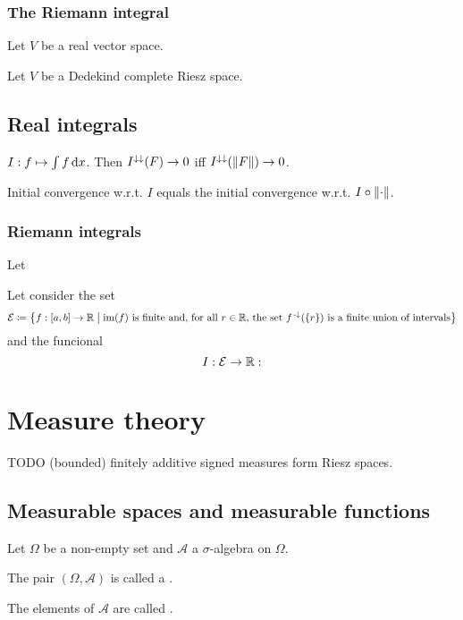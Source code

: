 \subsection{The Riemann integral}
\begin{definition}
Let $V$ be a real vector space. 
\end{definition}



\begin{definition}
Let $V$ be a Dedekind complete Riesz space. 
\end{definition}


\section{Real integrals}

\begin{proposition}
$I: f\mapsto \int f \operatorname{d \!}{x}$. Then $I^{\downarrow\downarrow}(F) \to 0$ iff $I^{\downarrow\downarrow}(\lVert F\rVert) \to 0$.
\end{proposition}
\begin{corollary}
Initial convergence w.r.t. $I$ equals the initial convergence w.r.t. $I\circ \lVert\cdot\rVert$.
\end{corollary}

\subsection{Riemann integrals}
\begin{definition}
Let
\end{definition}


\begin{definition}
Let consider the set
\[ \mathcal{E} \defeq \setbuilder{f: \interval{a,b}\to \R}{\text{$\im(f)$ is finite and, for all $r\in \R$, the set $f^\preimf(\{r\})$ is a finite union of intervals}} \]
and the funcional
\[ I : \mathcal{E} \to \mathbb{R}:  \]
\end{definition}




\chapter{Measure theory}
TODO (bounded) finitely additive signed measures form Riesz spaces.

\section{Measurable spaces and measurable functions}
\begin{definition}
Let $\Omega$ be a non-empty set and $\mathcal{A}$ a $\sigma$-algebra on $\Omega$.

The pair $(\Omega, \mathcal{A})$ is called a .

The elements of $\mathcal{A}$ are called .
\end{definition}


